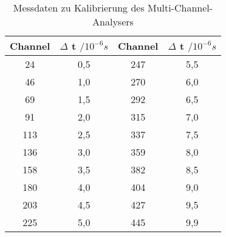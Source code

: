 \begin{table}[h!]
  \centering
  \caption{Messdaten zu Kalibrierung des Multi-Channel-Analysers}
  \label{tab:kalibrierung}
  \begin{tabular}{c c c c}
    \toprule
      Channel & $\Delta$ t $/ 10^{-6} s$ & Channel & $\Delta$ t $/ 10^{-6} s$ \\
      \midrule
         24   &  0,5   &  247   &  5,5  \\
         46   &  1,0   &  270   &  6,0  \\
         69   &  1,5   &  292   &  6,5  \\
         91   &  2,0   &  315   &  7,0  \\
        113   &  2,5   &  337   &  7,5  \\
        136   &  3,0   &  359   &  8,0  \\
        158   &  3,5   &  382   &  8,5  \\
        180   &  4,0   &  404   &  9,0  \\
        203   &  4,5   &  427   &  9,5  \\
        225   &  5,0   &  445   &  9,9  \\
    \bottomrule
  \end{tabular}
\end{table}

%
